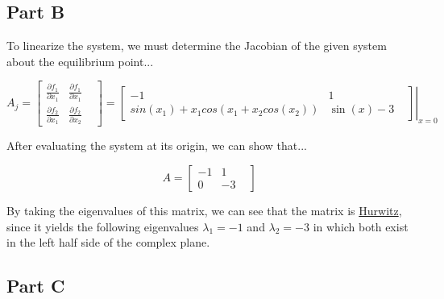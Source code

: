 \subsection*{Part B}

To linearize the system, we must determine the Jacobian of the given system about the equilibrium point...

$$
A_j =
\begin{bmatrix}
  \frac{\partial f_{1}}{\partial x_{1}} & \frac{\partial f_{1}}{\partial x_{1}} & \\

  \frac{\partial f_{2}}{\partial x_{1}} & \frac{\partial f_{2}}{\partial x_{2}}&
\end{bmatrix}
=
\left .
\begin{bmatrix}

-1 & 1 & \\

  sin(x_1) + x_1cos(x_1 + x_2cos(x_2))  & \sin (x)-3&

\end{bmatrix} \right\rvert_{x=0}
$$


\noindent After evaluating the system at its origin, we can show that...

$$
A = \begin{bmatrix}
-1 & 1 & \\
0 & -3 &
\end{bmatrix}
$$

\noindent By taking the eigenvalues of this matrix, we can see that the matrix is \underline{Hurwitz}, since it yields the following eigenvalues $\lambda_1 = -1$ and $\lambda_2 = -3$ in which both exist in the left half side of the complex plane.
\subsection*{Part C}
